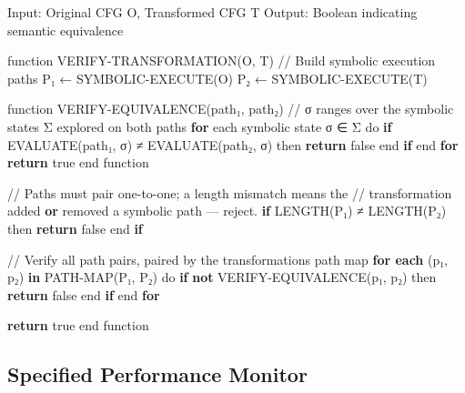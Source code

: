 \documentclass[
  11pt,
]{article}
\newenvironment{Shaded}{}{}
\newcommand{\BuiltInTok}[1]{\textcolor[rgb]{0.00,0.50,0.00}{#1}}
\newcommand{\ControlFlowTok}[1]{\textcolor[rgb]{0.00,0.44,0.13}{\textbf{#1}}}
\newcommand{\ErrorTok}[1]{\textcolor[rgb]{1.00,0.00,0.00}{\textbf{#1}}}
\newcommand{\KeywordTok}[1]{\textcolor[rgb]{0.00,0.44,0.13}{\textbf{#1}}}
\newcommand{\NormalTok}[1]{#1}
\newcommand{\OperatorTok}[1]{\textcolor[rgb]{0.40,0.40,0.40}{#1}}
\newcommand{\StringTok}[1]{\textcolor[rgb]{0.25,0.44,0.63}{#1}}
\begin{document}
\begin{Shaded}
\begin{Highlighting}[]
\NormalTok{Input: Original CFG O, Transformed CFG T}
\NormalTok{Output: Boolean indicating semantic equivalence}

\NormalTok{function VERIFY}\OperatorTok{{-}}\NormalTok{TRANSFORMATION(O, T)}
    \OperatorTok{//}\NormalTok{ Build symbolic execution paths}
\NormalTok{    P₁ ← SYMBOLIC}\OperatorTok{{-}}\NormalTok{EXECUTE(O)}
\NormalTok{    P₂ ← SYMBOLIC}\OperatorTok{{-}}\NormalTok{EXECUTE(T)}
    
\NormalTok{    function VERIFY}\OperatorTok{{-}}\NormalTok{EQUIVALENCE(path₁, path₂)}
        \OperatorTok{//}\NormalTok{ σ ranges over the symbolic states Σ explored on both paths}
        \ControlFlowTok{for}\NormalTok{ each symbolic state σ ∈ Σ do}
            \ControlFlowTok{if}\NormalTok{ EVALUATE(path₁, σ) ≠ EVALUATE(path₂, σ) then}
                \ControlFlowTok{return}\NormalTok{ false}
\NormalTok{            end }\ControlFlowTok{if}
\NormalTok{        end }\ControlFlowTok{for}
        \ControlFlowTok{return}\NormalTok{ true}
\NormalTok{    end function}
    
    \OperatorTok{//}\NormalTok{ Paths must pair one}\OperatorTok{{-}}\NormalTok{to}\OperatorTok{{-}}\NormalTok{one}\OperatorTok{;}\NormalTok{ a length mismatch means the}
    \OperatorTok{//}\NormalTok{ transformation added }\KeywordTok{or}\NormalTok{ removed a symbolic path — reject.}
    \ControlFlowTok{if}\NormalTok{ LENGTH(P₁) ≠ LENGTH(P₂) then}
        \ControlFlowTok{return}\NormalTok{ false}
\NormalTok{    end }\ControlFlowTok{if}
    
    \OperatorTok{//}\NormalTok{ Verify }\BuiltInTok{all}\NormalTok{ path pairs, paired by the transformation}\StringTok{\textquotesingle{}s path map}
\ErrorTok{    for each }\NormalTok{(p₁, p₂) }\KeywordTok{in}\NormalTok{ PATH}\OperatorTok{{-}}\NormalTok{MAP(P₁, P₂) do}
        \ControlFlowTok{if} \KeywordTok{not}\NormalTok{ VERIFY}\OperatorTok{{-}}\NormalTok{EQUIVALENCE(p₁, p₂) then}
            \ControlFlowTok{return}\NormalTok{ false}
\NormalTok{        end }\ControlFlowTok{if}
\NormalTok{    end }\ControlFlowTok{for}
    
    \ControlFlowTok{return}\NormalTok{ true}
\NormalTok{end function}
\end{Highlighting}
\end{Shaded}

\subsection{Specified Performance
Monitor}\label{specified-performance-monitor}
\end{document}
